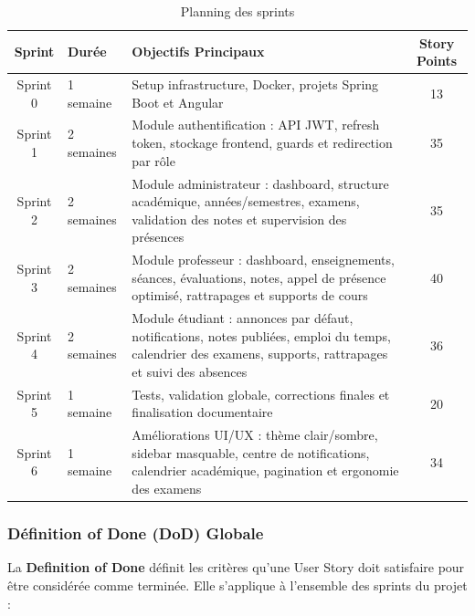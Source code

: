 \documentclass[12pt,a4paper]{report}
\begin{document}
\begin{table}[H]
\centering
\caption{Planning des sprints}
\begin{tabular}{|c|p{3cm}|p{8cm}|c|}
\hline
\textbf{Sprint} & \textbf{Durée} & \textbf{Objectifs Principaux} & \textbf{Story Points} \\
\hline
Sprint 0 & 1 semaine & Setup infrastructure, Docker, projets Spring Boot et Angular & 13 \\
\hline
Sprint 1 & 2 semaines & Module authentification : API JWT, refresh token, stockage frontend, guards et redirection par rôle & 35 \\
\hline
Sprint 2 & 2 semaines & Module administrateur : dashboard, structure académique, années/semestres, examens, validation des notes et supervision des présences & 35 \\
\hline
Sprint 3 & 2 semaines & Module professeur : dashboard, enseignements, séances, évaluations, notes, appel de présence optimisé, rattrapages et supports de cours & 40 \\
\hline
Sprint 4 & 2 semaines & Module étudiant : annonces par défaut, notifications, notes publiées, emploi du temps, calendrier des examens, supports, rattrapages et suivi des absences & 36 \\
\hline
Sprint 5 & 1 semaine & Tests, validation globale, corrections finales et finalisation documentaire & 20 \\
\hline
Sprint 6 & 1 semaine & Améliorations UI/UX : thème clair/sombre, sidebar masquable, centre de notifications, calendrier académique, pagination et ergonomie des examens & 34 \\
\hline
\end{tabular}
\end{table}

\subsubsection{Définition of Done (DoD) Globale}

La \textbf{Definition of Done} définit les critères qu'une User Story doit satisfaire pour être considérée comme terminée. Elle s'applique à l'ensemble des sprints du projet :
\end{document}
